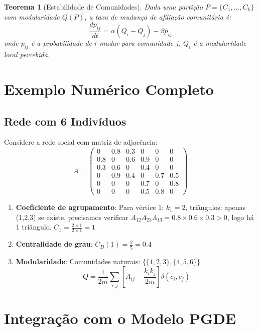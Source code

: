 \documentclass[12pt, a4paper]{article}
\newtheorem{theorem}{Teorema}
\begin{document}
\begin{theorem}[Estabilidade de Comunidades]
Dada uma partição $P = \{C_1, \dots, C_k\}$ com modularidade $Q(P)$, a taxa de mudança de afiliação comunitária é:
\[
\frac{dp_{ij}}{dt} = \alpha(Q_i - Q_j) - \beta p_{ij}
\]
onde $p_{ij}$ é a probabilidade de $i$ mudar para comunidade $j$, $Q_i$ é a modularidade local percebida.
\end{theorem}

\section{Exemplo Numérico Completo}

\subsection{Rede com 6 Indivíduos}

Considere a rede social com matriz de adjacência:
\[
A = \begin{pmatrix}
0 & 0.8 & 0.3 & 0 & 0 & 0 \\
0.8 & 0 & 0.6 & 0.9 & 0 & 0 \\
0.3 & 0.6 & 0 & 0.4 & 0 & 0 \\
0 & 0.9 & 0.4 & 0 & 0.7 & 0.5 \\
0 & 0 & 0 & 0.7 & 0 & 0.8 \\
0 & 0 & 0 & 0.5 & 0.8 & 0
\end{pmatrix}
\]

\begin{enumerate}
\item \textbf{Coeficiente de agrupamento}:
Para vértice 1: $k_1 = 2$, triângulos: apenas (1,2,3) se existe, precisamos verificar
$A_{12}A_{23}A_{13} = 0.8 \times 0.6 \times 0.3 > 0$, logo há 1 triângulo.
$C_1 = \frac{2 \times 1}{2 \times 1} = 1$

\item \textbf{Centralidade de grau}:
$C_D(1) = \frac{2}{5} = 0.4$

\item \textbf{Modularidade}:
Comunidades naturais: $\{\{1,2,3\}, \{4,5,6\}\}$
\[
Q = \frac{1}{2m} \sum_{i,j} \left[A_{ij} - \frac{k_i k_j}{2m}\right] \delta(c_i, c_j)
\]
\end{enumerate}

\section{Integração com o Modelo PGDE}
\end{document}
